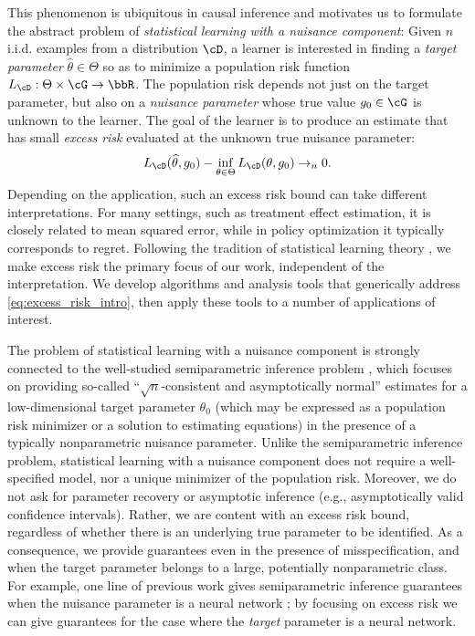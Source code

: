 \documentclass[11pt]{article} %
\newcommand{\pref}[1]{\cref{#1}}
\theoremstyle{theorem}  %
\theoremstyle{plain}
\newcommand{\wh}[1]{\widehat{#1}}
\newcommand{\R}{\bbR}
\newcommand{\poprisk}{L_{\cD}}
\newcommand{\esttwo}{\wh{\theta}}
\newcommand{\nuisance}{\cG}
\newcommand{\target}{\Theta}
\newcommand{\gtone}{g_0}
\newcommand{\param}{parameter\xspace}
\begin{document}
%
This phenomenon is ubiquitous in causal inference and motivates us to formulate the abstract problem of \emph{statistical learning with a nuisance component}: Given $n$ i.i.d. examples from a distribution $\cD$, a learner is interested in finding a \emph{target \param} $\esttwo\in \target$ so as to minimize a population risk function $\poprisk: \target \times \nuisance \rightarrow \R$. The population risk depends not just on the target \param, but also on a  \emph{nuisance \param} whose true value $\gtone\in \nuisance$ is unknown to the learner. The goal of the learner is to produce an estimate that has small \emph{excess risk} evaluated at the unknown true nuisance \param:
\begin{equation}
\label{eq:excess_risk_intro}
\poprisk(\esttwo,g_0) - \inf_{\theta\in\target}\poprisk(\theta,g_0)\to_n0.
\end{equation}
Depending on the application, such an excess risk bound can take different interpretations. For many settings, such as treatment effect estimation, it is closely related to mean squared error, while in policy optimization it typically corresponds to regret. Following the tradition of statistical learning theory \citep{vapnik1995nature,bousquet2004introduction}, we make excess risk the primary focus of our work, independent of the interpretation. We develop algorithms and analysis tools that generically address \pref{eq:excess_risk_intro}, then apply these tools to a number of applications of interest.

The problem of statistical learning with a nuisance component is strongly connected to the well-studied semiparametric inference problem \citep{levit1976efficiency,ibragimov1981statistical,pfanzagl1982contributions,bickel1982adaptive,klaassen1987consistent,robinson1988root,bickel1993efficient,newey1994asymptotic,robins1995semiparametric, ai2003efficient,van2003unified,van2003unifiedb,ai2007estimation,tsiatis2007semiparametric,kosorok2008introduction,van2011targeted,ai2012semiparametric,chernozhukov2016locally,belloni2017program,chernozhukov2016double}, which focuses on providing so-called ``$\sqrt{n}$-consistent and asymptotically normal'' estimates for a low-dimensional target parameter $\theta_0$ (which may be expressed as a population risk minimizer or a solution to estimating equations) in the presence of a typically nonparametric nuisance parameter. Unlike the semiparametric inference problem, statistical learning with a nuisance component does not require a well-specified model, nor a unique minimizer of the population risk. Moreover, we do not ask for parameter recovery or asymptotic inference (e.g., asymptotically valid confidence intervals). Rather, we are content with an excess risk bound, regardless of whether there is an underlying true parameter to be identified. As a consequence, we provide guarantees even in the presence of misspecification, and when the target \param belongs to a large, potentially nonparametric class. For example, one line of previous work gives semiparametric inference guarantees when the nuisance \param is a neural network \citep{chen1999improved,farrell2018deep}; by focusing on excess risk we can give guarantees for the case where the \emph{target} \param is a neural network.
\end{document}
